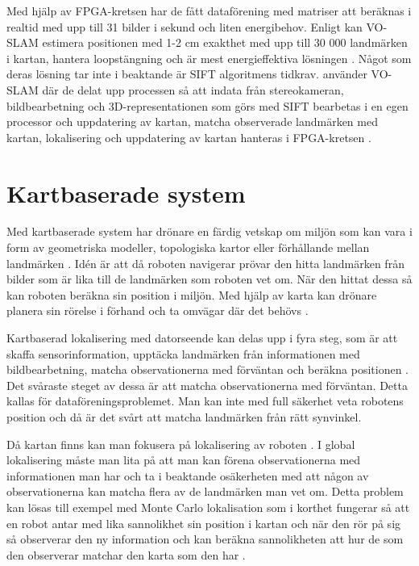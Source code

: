 Med hjälp av FPGA-kretsen har de fått dataförening med matriser att beräknas i realtid med upp till 31 bilder i sekund och liten energibehov. Enligt \cite{voslam} kan VO-SLAM estimera positionen med 1-2 cm exakthet med upp till 30 000 landmärken i kartan, hantera loopstängning och är mest energieffektiva lösningen \citep{voslam}. Något som deras lösning tar inte i beaktande är SIFT algoritmens tidkrav. \cite{voslamlatif} använder VO-SLAM där de delat upp processen så att indata från stereokameran, bildbearbetning och 3D-representationen som görs med SIFT bearbetas i en egen processor och uppdatering av kartan, matcha observerade landmärken med kartan, lokalisering och uppdatering av kartan hanteras i FPGA-kretsen \citep{voslamlatif}. 

\section{Kartbaserade system}

Med kartbaserade system har drönare en färdig vetskap om miljön som kan vara i form av geometriska modeller, topologiska kartor eller förhållande mellan landmärken \citep{982903}. Idén är att då roboten navigerar prövar den hitta landmärken från bilder som är lika till de landmärken som roboten vet om. När den hittat dessa så kan roboten beräkna sin position i miljön. Med hjälp av karta kan drönare planera sin rörelse i förhand och ta omvägar där det behövs \citep{geospatial}. 

Kartbaserad lokalisering med datorseende kan delas upp i fyra steg, som är att skaffa sensorinformation, upptäcka landmärken från informationen med bildbearbetning, matcha observationerna med förväntan och beräkna positionen \citep{982903}. Det svåraste steget av dessa är att matcha observationerna med förväntan. Detta kallas för dataföreningsproblemet. Man kan inte med full säkerhet veta robotens position och då är det svårt att matcha landmärken från rätt synvinkel.

Då kartan finns kan man fokusera på lokalisering av roboten \citep{982903}. I global lokalisering måste man lita på att man kan förena observationerna med informationen man har och ta i beaktande osäkerheten med att någon av observationerna kan matcha flera av de landmärken man vet om. Detta problem kan lösas till exempel med Monte Carlo lokalisation som i korthet fungerar så att en robot antar med lika sannolikhet sin position i kartan och när den rör på sig så observerar den ny information och kan beräkna sannolikheten att hur de som den observerar matchar den karta som den har \citep{772544}.

